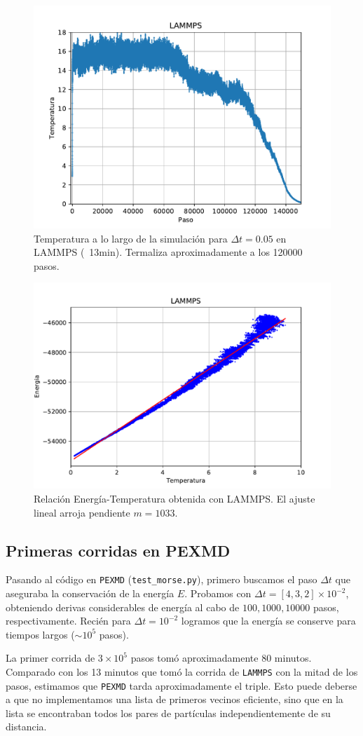 \documentclass[twoside, 12pt]{article}
\begin{document}
\begin{figure}[H]
	\centering
	\includegraphics[width=0.5\columnwidth]{temp_lammps.pdf}
	\caption{Temperatura a lo largo de la simulación para $\Delta t = 0.05$ en LAMMPS (~13min). Termaliza aproximadamente a los 120000 pasos.}
	\label{fig:temp_lammps}
\end{figure}

\begin{figure}[H]
	\centering
	\includegraphics[width=0.5\columnwidth]{evt_lammps.pdf}
	\caption{Relación Energía-Temperatura obtenida con LAMMPS. El ajuste lineal arroja pendiente $m=1033$.}
	\label{fig:EvsT_lammps}
\end{figure}

\subsection{Primeras corridas en PEXMD}

Pasando al código en \texttt{PEXMD} (\texttt{test\_morse.py}), primero buscamos el paso $\Delta t$ que aseguraba la conservación de la energía $E$. 
Probamos con $\Delta t = [4,3,2]\times10^{-2}$, obteniendo derivas considerables de energía al cabo de $100, 1000, 10000$ pasos, respectivamente. 
Recién para $\Delta t = 10^{-2}$ logramos que la energía se conserve para tiempos largos ($\sim 10^{5}$ pasos).

La primer corrida de $3\times10^{5}$ pasos tomó aproximadamente 80 minutos. 
Comparado con los 13 minutos que tomó la corrida de \texttt{LAMMPS} con la mitad de los pasos, estimamos que \texttt{PEXMD} tarda aproximadamente el triple. 
Esto puede deberse a que no implementamos una lista de primeros vecinos eficiente, sino que en la lista se encontraban todos los pares de partículas independientemente de su distancia.
\end{document}
